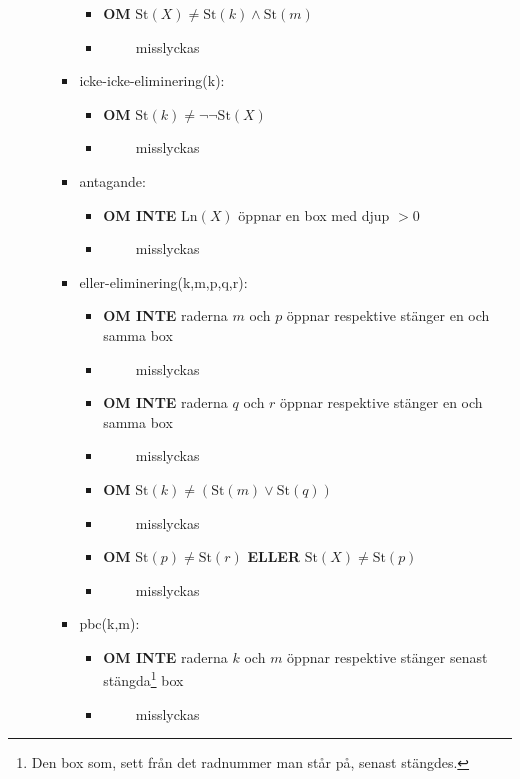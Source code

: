 \documentclass[a4paper,10.5pt]{article}
\newcommand{\Ln}[1]{\mathrm{Ln}(#1)}
\newcommand{\St}[1]{\mathrm{St}(#1)}
\begin{document}
\begin{itemize}
\begin{itemize}
\begin{itemize}
            \begin{itemize}
            \item[] \textbf{OM} $\St{X} \neq \St{k} \land \St{m}$
            \item[] $\qquad$ misslyckas
            \end{itemize}
        \item[] icke-icke-eliminering(k):
            \begin{itemize}
            \item[] \textbf{OM} $\St{k} \neq \lnot \lnot \St{X}$
            \item[] $\qquad$ misslyckas
            \end{itemize}
        \item[] antagande:
            \begin{itemize}
            \item[] \textbf{OM INTE} $\Ln{X}$ öppnar en box med djup $>0$
            \item[] $\qquad$ misslyckas
            \end{itemize}
\newpage
        \item[] eller-eliminering(k,m,p,q,r):
            \begin{itemize}
            \item[] \textbf{OM INTE} raderna $m$ och $p$ öppnar respektive stänger en och samma box 
            \item[] $\qquad$ misslyckas
            \item[] \textbf{OM INTE} raderna $q$ och $r$ öppnar respektive stänger en och samma box 
            \item[] $\qquad$ misslyckas
            \item[] \textbf{OM} $\St{k} \neq (\St{m} \lor \St{q})$
            \item[] $\qquad$ misslyckas
            \item[] \textbf{OM} $\St{p} \neq \St{r}$ \textbf{ELLER} $\St{X} \neq \St{p}$
            \item[] $\qquad$ misslyckas
            \end{itemize}
        \item[] pbc(k,m):
            \begin{itemize}
            \item[] \textbf{OM INTE} raderna $k$ och $m$ öppnar respektive stänger senast stängda\footnote{Den box som, sett från det radnummer man står på, senast stängdes.} box
            \item[] $\qquad$ misslyckas

\end{itemize}
\end{itemize}
\end{itemize}
\end{itemize}
\end{document}
